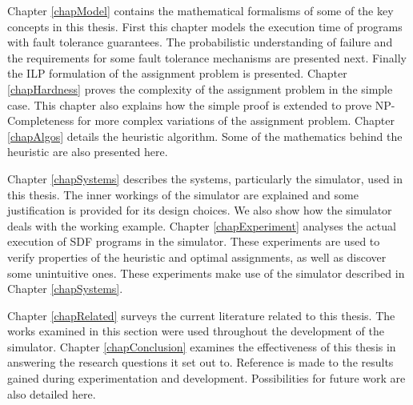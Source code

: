 Chapter \ref{chapModel} contains the mathematical formalisms of some of the key concepts in this thesis.
First this chapter models the execution time of programs with fault tolerance guarantees.
The probabilistic understanding of failure and the requirements for some fault tolerance mechanisms are presented next.
Finally the ILP formulation of the assignment problem is presented.
Chapter \ref{chapHardness} proves the complexity of the assignment problem in the simple case.
This chapter also explains how the simple proof is extended to prove NP-Completeness for more complex variations of the assignment problem.
Chapter \ref{chapAlgos} details the heuristic algorithm.
Some of the mathematics behind the heuristic are also presented here.

Chapter \ref{chapSystems} describes the systems, particularly the simulator, used in this thesis.
The inner workings of the simulator are explained and some justification is provided for its design choices.
We also show how the simulator deals with the working example.
Chapter \ref{chapExperiment} analyses the actual execution of SDF programs in the simulator.
These experiments are used to verify properties of the heuristic and optimal assignments, as well as discover some unintuitive ones.
These experiments make use of the simulator described in Chapter \ref{chapSystems}.

Chapter \ref{chapRelated} surveys the current literature related to this thesis.
The works examined in this section were used throughout the development of the simulator.
Chapter \ref{chapConclusion} examines the effectiveness of this thesis in answering the research questions it set out to.
Reference is made to the results gained during experimentation and development.
Possibilities for future work are also detailed here.